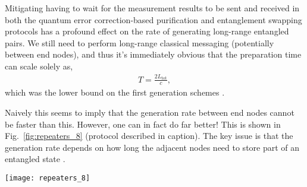 Mitigating having to wait for the measurement results to be sent and received in both the quantum error correction-based purification and entanglement swapping protocols has a profound effect on the rate of generating long-range entangled pairs. We still need to perform long-range classical messaging (potentially between end nodes), and thus it's immediately obvious that the preparation time can scale solely as,
\begin{align}
	T = \frac{2 L_\mathrm{tot}}{c},
\end{align}
which was the lower bound on the first generation schemes \cite{bib:munro10}.

Naively this seems to imply that the generation rate between end nodes cannot be faster than this. However, one can in fact do far better! This is shown in Fig.~\ref{fig:repeaters_8} (protocol described in caption). The key issue is that the generation rate depends on how long the adjacent nodes need to store part of an entangled state \cite{bib:jiang09, bib:munro10, bib:Muralidharan2016}. 

\begin{figure*}[!htb]
\texttt{[image: repeaters\_8]}
\caption{A butterfly design quantum repeater network protocol that reduces the requirements on all the quantum memory times to only that associated with the signalling time between adjacent repeater nodes \cite{bib:munro10}. Enough pairs must be generated between the node to ensure that we can use them in the error correction code in a single round trip time between adjacent nodes. The scheme relies on multiple entangled pairs being generated temporally, starting from the mid point of the network. The protocol begins with the central node creating links to both the left and right nearest neighbour nodes in sufficient number to allow an error correction code to be implemented. Once they are created the error correction circuits are applied to the links left and right of this central node (effectively creating encoded logical links). Entanglement swapping at the middle node is then applied  between these logical links, creating a logical link between the left and right adjacent nodes. The left and right nodes can then do the same to their next adjacent repeater nodes, error correcting as they go, until the desired end-to-end entangled link is achieved.}
\label{fig:repeaters_8}
\end{figure*} 

